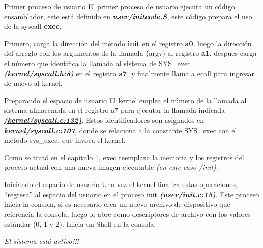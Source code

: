 \documentclass{libs/ufc_format}
\begin{document}
\begin{frame}{Primer proceso de usuario}
  El primer proceso de usuario ejecuta un código ensamblador, este está definido en \href{https://github.com/CarlosSandoval-03/xv6-riscv/blob/riscv/user/initcode.S}{\textbf{\textit{user/initcode.S}}}, este código prepara el uso de la syscall \textbf{exec}.

  \vspace{0.3cm}

  Primero, carga la dirección del método \textbf{init} en el registro \textbf{a0}, luego la dirección del arreglo con los argumentos de la llamada \textbf({argv)} al registro \textbf{a1}, despues carga el número que identifica la llamada al sistema de \href{https://github.com/CarlosSandoval-03/xv6-riscv/blob/riscv/kernel/syscall.h\#L8}{SYS\_exec \textbf{\textit{(kernel/syscall.h:8)}}} en el registro \textbf{a7}, y finalmente llama a ecall para ingresar de nuevo al kernel. \cite{xv6_book}
\end{frame}
\begin{frame}{Preparando el espacio de usuario}
  El kernel emplea el número de la llamada al sistema almacenada en el registro a7 para ejecutar la llamada indicada \href{https://github.com/CarlosSandoval-03/xv6-riscv/blob/riscv/kernel/syscall.c\#L132}{\textbf{\textit{(kernel/syscall.c:132)}}}. Estos identificadores son asignados en \href{https://github.com/CarlosSandoval-03/xv6-riscv/blob/riscv/kernel/syscall.c\#L107}{\textbf{\textit{kernel/syscall.c:107}}}, donde se relaciona a la constante SYS\_exec con el método sys\_exec, que invoca el kernel. \cite{xv6_book}

  \vspace{0.3cm}

  Como se trató en el capítulo 1, exec reemplaza la memoria y los registros del proceso actual con una nueva imagen ejecutable \emph{(en este caso /init)}.
\end{frame}
\begin{frame}{Iniciando el espacio de usuario}
  Una vez el kernel finaliza estas operaciones, “regresa” al espacio del usuario en el proceso init \href{https://github.com/CarlosSandoval-03/xv6-riscv/blob/riscv/user/init.c\#L15}{\textbf{\textit{(user/init.c:15)}}}. Este proceso inicia la consola, si es necesario crea un nuevo archivo de dispositivo que referencia la consola, luego lo abre como descriptores de archivo con los valores estándar (0, 1 y 2). Inicia un Shell en la consola.

  \vspace{0.2cm}

  \emph{El sistema está activo!!!}
\end{frame}
\end{document}
